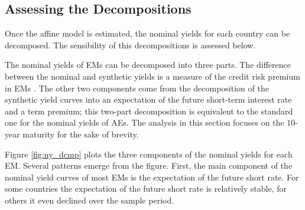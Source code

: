 {%


\subsection{Assessing the Decompositions}
\iftoggle{toclinks}{\gototoc}{} %
Once the affine model is estimated, the nominal yields for each country can be decomposed. 
The sensibility of this decompositions is assessed below. %

The nominal yields of EMs can be decomposed into three parts.
The difference between the nominal and synthetic yields is a measure of the credit risk premium in EMs \citep{DuSchreger:2016JoF}.
The other two components come from the decomposition of the synthetic yield curves into an expectation of the future short-term interest rate and a term premium; this two-part decomposition is equivalent to the standard one for the nominal yields of AEs.
The analysis in this section focuses on the \(10\)-year maturity for the sake of brevity.
%	

Figure \ref{fig:ny_dcmp} plots the three components of the nominal yields for each EM.
Several patterns emerge from the figure. 
First, the main component of the nominal yield curves of most EMs is the expectation of the future short rate.
For some countries the expectation of the future short rate is relatively stable, for others it even declined over the sample period.

}

